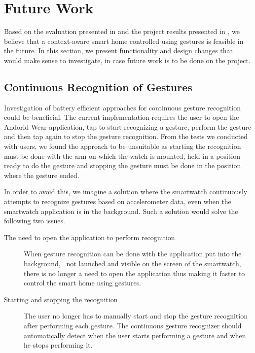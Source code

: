 \section{Future Work}
\label{sec:conclusion:future-work}

Based on the evaluation presented in  and the project results presented in , we believe that a context-aware smart home controlled using gestures is feasible in the future. 
In this section, we present functionality and design changes that would make sense to investigate, in case future work is to be done on the project.

\subsection{Continuous Recognition of Gestures}

Investigation of battery efficient approaches for continuous gesture recognition could be beneficial. The current implementation requires the user to open the Andorid Wear application, tap to start recognizing a gesture, perform the gesture and then tap again to stop the gesture recognition. From the tests we conducted with users, we found the approach to be unsuitable as starting the recognition must be done with the arm on which the watch is mounted, held in a position ready to do the gesture and stopping the gesture must be done in the position where the gesture ended.

In order to avoid this, we imagine a solution where the smartwatch continuously attempts to recognize gestures based on accelerometer data, even when the smartwatch application is in the background. Such a solution would solve the following two issues.

\begin{description}
\item[The need to open the application to perform recognition] When gesture recognition can be done with the application put into the background, \ie~not launched and visible on the screen of the smartwatch, there is no longer a need to open the application thus making it faster to control the smart home using gestures.
\item[Starting and stopping the recognition] The user no longer has to manually start and stop the gesture recognition after performing each gesture. The continuous gesture recognizer should automatically detect when the user starts performing a gesture and when he stops performing it.
\end{description}

